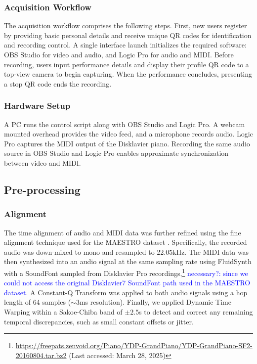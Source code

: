 \documentclass{article}
\newcommand{\alex}[1]{\textcolor{blue}{#1}}%
\begin{document}
\subsubsection{Acquisition Workflow}
The acquisition workflow comprises the following steps. 
First, new users register by providing basic personal details and receive unique QR codes for identification and recording control. A single interface launch initializes the required software: OBS Studio for video and audio, and Logic Pro for audio and MIDI. Before recording, users input performance details and display their profile QR code to a top-view camera to begin capturing. When the performance concludes, presenting a stop QR code ends the recording. %


\subsubsection{Hardware Setup} 
A PC runs the control script along with OBS Studio and Logic Pro. A webcam mounted overhead provides the video feed, and a microphone records audio. Logic Pro captures the MIDI output of the Disklavier piano. Recording the same audio source in OBS Studio and Logic Pro enables approximate synchronization between video and MIDI.

\subsection{Pre-processing}
\subsubsection{Alignment}\label{subsubsec:alignment}

The time alignment of audio and MIDI data was further refined using the fine alignment technique used for the MAESTRO dataset \cite{ICLR19Hawthorne}.
Specifically, the recorded audio was down-mixed to mono and resampled to {22.05}\si{kHz}. 
The MIDI data was then synthesized into an audio signal at the same sampling rate using FluidSynth with a SoundFont sampled from Disklavier Pro recordings,\footnote{\href{https://freepats.zenvoid.org/Piano/YDP-GrandPiano/YDP-GrandPiano-SF2-20160804.tar.bz2}{https://freepats.zenvoid.org/Piano/YDP-GrandPiano/YDP-GrandPiano-SF2-20160804.tar.bz2} (Last accessed: March 28, 2025)\label{soundfont}} 
\alex{necessary?: since we could not access the original Disklavier7 SoundFont path used in the MAESTRO dataset}.
A Constant-Q Transform was applied to both audio signals using a hop length of 64 samples ($\sim$3\si{ms} resolution). Finally, we applied Dynamic Time Warping within a Sakoe-Chiba band of $\pm2.5$\si{s} to detect and correct any remaining temporal discrepancies, such as small constant offsets or jitter.
\end{document}
